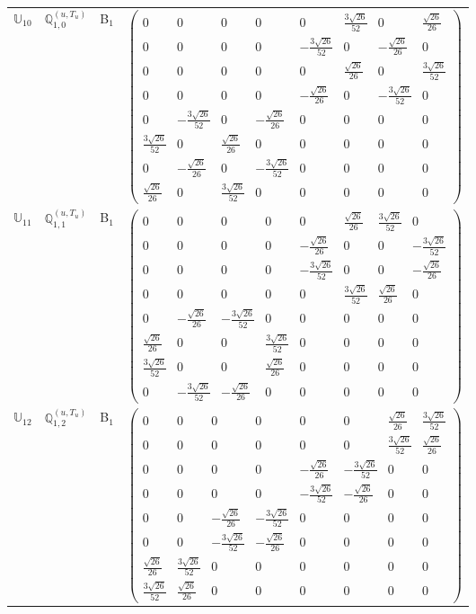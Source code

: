 \documentclass[fleqn,10pt,landscape]{article}
\begin{document}
\begin{itemize}
\begin{center}
\begin{longtable}{c|c|c|c}
$ \mathbb{U}_{10} $ & $\mathbb{Q}_{1,0}^{(u,T_{u})}$ & B$_{1}$ & $\begin{pmatrix} 0 & 0 & 0 & 0 & 0 & \frac{3 \sqrt{26}}{52} & 0 & \frac{\sqrt{26}}{26} \\ 0 & 0 & 0 & 0 & - \frac{3 \sqrt{26}}{52} & 0 & - \frac{\sqrt{26}}{26} & 0 \\ 0 & 0 & 0 & 0 & 0 & \frac{\sqrt{26}}{26} & 0 & \frac{3 \sqrt{26}}{52} \\ 0 & 0 & 0 & 0 & - \frac{\sqrt{26}}{26} & 0 & - \frac{3 \sqrt{26}}{52} & 0 \\ 0 & - \frac{3 \sqrt{26}}{52} & 0 & - \frac{\sqrt{26}}{26} & 0 & 0 & 0 & 0 \\ \frac{3 \sqrt{26}}{52} & 0 & \frac{\sqrt{26}}{26} & 0 & 0 & 0 & 0 & 0 \\ 0 & - \frac{\sqrt{26}}{26} & 0 & - \frac{3 \sqrt{26}}{52} & 0 & 0 & 0 & 0 \\ \frac{\sqrt{26}}{26} & 0 & \frac{3 \sqrt{26}}{52} & 0 & 0 & 0 & 0 & 0 \end{pmatrix}$ \\
$ \mathbb{U}_{11} $ & $\mathbb{Q}_{1,1}^{(u,T_{u})}$ & B$_{1}$ & $\begin{pmatrix} 0 & 0 & 0 & 0 & 0 & \frac{\sqrt{26}}{26} & \frac{3 \sqrt{26}}{52} & 0 \\ 0 & 0 & 0 & 0 & - \frac{\sqrt{26}}{26} & 0 & 0 & - \frac{3 \sqrt{26}}{52} \\ 0 & 0 & 0 & 0 & - \frac{3 \sqrt{26}}{52} & 0 & 0 & - \frac{\sqrt{26}}{26} \\ 0 & 0 & 0 & 0 & 0 & \frac{3 \sqrt{26}}{52} & \frac{\sqrt{26}}{26} & 0 \\ 0 & - \frac{\sqrt{26}}{26} & - \frac{3 \sqrt{26}}{52} & 0 & 0 & 0 & 0 & 0 \\ \frac{\sqrt{26}}{26} & 0 & 0 & \frac{3 \sqrt{26}}{52} & 0 & 0 & 0 & 0 \\ \frac{3 \sqrt{26}}{52} & 0 & 0 & \frac{\sqrt{26}}{26} & 0 & 0 & 0 & 0 \\ 0 & - \frac{3 \sqrt{26}}{52} & - \frac{\sqrt{26}}{26} & 0 & 0 & 0 & 0 & 0 \end{pmatrix}$ \\
$ \mathbb{U}_{12} $ & $\mathbb{Q}_{1,2}^{(u,T_{u})}$ & B$_{1}$ & $\begin{pmatrix} 0 & 0 & 0 & 0 & 0 & 0 & \frac{\sqrt{26}}{26} & \frac{3 \sqrt{26}}{52} \\ 0 & 0 & 0 & 0 & 0 & 0 & \frac{3 \sqrt{26}}{52} & \frac{\sqrt{26}}{26} \\ 0 & 0 & 0 & 0 & - \frac{\sqrt{26}}{26} & - \frac{3 \sqrt{26}}{52} & 0 & 0 \\ 0 & 0 & 0 & 0 & - \frac{3 \sqrt{26}}{52} & - \frac{\sqrt{26}}{26} & 0 & 0 \\ 0 & 0 & - \frac{\sqrt{26}}{26} & - \frac{3 \sqrt{26}}{52} & 0 & 0 & 0 & 0 \\ 0 & 0 & - \frac{3 \sqrt{26}}{52} & - \frac{\sqrt{26}}{26} & 0 & 0 & 0 & 0 \\ \frac{\sqrt{26}}{26} & \frac{3 \sqrt{26}}{52} & 0 & 0 & 0 & 0 & 0 & 0 \\ \frac{3 \sqrt{26}}{52} & \frac{\sqrt{26}}{26} & 0 & 0 & 0 & 0 & 0 & 0 \end{pmatrix}$ \\

\end{longtable}
\end{center}
\end{itemize}
\end{document}
